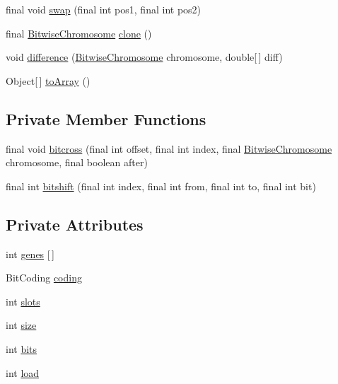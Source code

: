 \begin{DoxyCompactItemize}
final void \hyperlink{classjenes_1_1chromosome_1_1_bitwise_chromosome_afac4935f0e1d92b6b1aaf9de024e8cbb}{swap} (final int pos1, final int pos2)
\item 
final \hyperlink{classjenes_1_1chromosome_1_1_bitwise_chromosome}{Bitwise\-Chromosome} \hyperlink{classjenes_1_1chromosome_1_1_bitwise_chromosome_a2140b588068c430eaea7e9a7a5fe6b00}{clone} ()
\item 
void \hyperlink{classjenes_1_1chromosome_1_1_bitwise_chromosome_a33de872210289a305bc869c61a02eddb}{difference} (\hyperlink{classjenes_1_1chromosome_1_1_bitwise_chromosome}{Bitwise\-Chromosome} chromosome, double\mbox{[}$\,$\mbox{]} diff)
\item 
Object\mbox{[}$\,$\mbox{]} \hyperlink{classjenes_1_1chromosome_1_1_bitwise_chromosome_aa191192f94ce72a631237674d81ae393}{to\-Array} ()
\end{DoxyCompactItemize}
\subsection*{Private Member Functions}
\begin{DoxyCompactItemize}
\item 
final void \hyperlink{classjenes_1_1chromosome_1_1_bitwise_chromosome_aaa30338501f40d38e67dc23c4f326224}{bitcross} (final int offset, final int index, final \hyperlink{classjenes_1_1chromosome_1_1_bitwise_chromosome}{Bitwise\-Chromosome} chromosome, final boolean after)
\item 
final int \hyperlink{classjenes_1_1chromosome_1_1_bitwise_chromosome_a4570a4b004cc6e9806ab456e2061086d}{bitshift} (final int index, final int from, final int to, final int bit)
\end{DoxyCompactItemize}
\subsection*{Private Attributes}
\begin{DoxyCompactItemize}
\item 
int \hyperlink{classjenes_1_1chromosome_1_1_bitwise_chromosome_a46949d4204ed78a682345d88bb90eb5a}{genes} \mbox{[}$\,$\mbox{]}
\item 
Bit\-Coding \hyperlink{classjenes_1_1chromosome_1_1_bitwise_chromosome_aaca5e98844bcc938fecc81b959a63c03}{coding}
\item 
int \hyperlink{classjenes_1_1chromosome_1_1_bitwise_chromosome_ab7a20df94261bb660cadcfb834012f1f}{slots}
\item 
int \hyperlink{classjenes_1_1chromosome_1_1_bitwise_chromosome_a87b8652220ca81cad899a13e341bf954}{size}
\item 
int \hyperlink{classjenes_1_1chromosome_1_1_bitwise_chromosome_a7b10180d49ba676325c2387b6e40d395}{bits}
\item 
int \hyperlink{classjenes_1_1chromosome_1_1_bitwise_chromosome_a8270df05321265ad4a7a9345b901aad7}{load}
\end{DoxyCompactItemize}


